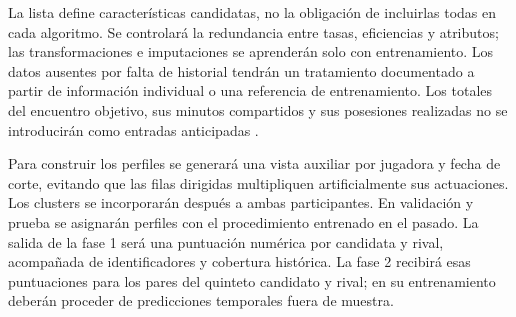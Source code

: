 \endgroup
La lista define características candidatas, no la obligación de incluirlas todas en cada algoritmo. Se controlará la redundancia entre tasas, eficiencias y atributos; las transformaciones e imputaciones se aprenderán solo con entrenamiento. Los datos ausentes por falta de historial tendrán un tratamiento documentado a partir de información individual o una referencia de entrenamiento. Los totales del encuentro objetivo, sus minutos compartidos y sus posesiones realizadas no se introducirán como entradas anticipadas \cite{sklearnCommonPitfallsPonderacion}.

Para construir los perfiles se generará una vista auxiliar por jugadora y fecha de corte, evitando que las filas dirigidas multipliquen artificialmente sus actuaciones. Los clusters se incorporarán después a ambas participantes. En validación y prueba se asignarán perfiles con el procedimiento entrenado en el pasado. La salida de la fase 1 será una puntuación numérica por candidata y rival, acompañada de identificadores y cobertura histórica. La fase 2 recibirá esas puntuaciones para los pares del quinteto candidato y rival; en su entrenamiento deberán proceder de predicciones temporales fuera de muestra.
